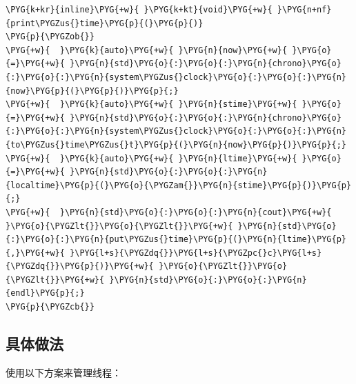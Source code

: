 \begin{codeblockbg}
\begin{Verbatim}[commandchars=\\\{\},breaklines=true,breakanywhere=true,fontsize=\codefont,xleftmargin=17bp]
\PYG{k+kr}{inline}\PYG{+w}{ }\PYG{k+kt}{void}\PYG{+w}{ }\PYG{n+nf}{print\PYGZus{}time}\PYG{p}{(}\PYG{p}{)}
\PYG{p}{\PYGZob{}}
\PYG{+w}{  }\PYG{k}{auto}\PYG{+w}{ }\PYG{n}{now}\PYG{+w}{ }\PYG{o}{=}\PYG{+w}{ }\PYG{n}{std}\PYG{o}{:}\PYG{o}{:}\PYG{n}{chrono}\PYG{o}{:}\PYG{o}{:}\PYG{n}{system\PYGZus{}clock}\PYG{o}{:}\PYG{o}{:}\PYG{n}{now}\PYG{p}{(}\PYG{p}{)}\PYG{p}{;}
\PYG{+w}{  }\PYG{k}{auto}\PYG{+w}{ }\PYG{n}{stime}\PYG{+w}{ }\PYG{o}{=}\PYG{+w}{ }\PYG{n}{std}\PYG{o}{:}\PYG{o}{:}\PYG{n}{chrono}\PYG{o}{:}\PYG{o}{:}\PYG{n}{system\PYGZus{}clock}\PYG{o}{:}\PYG{o}{:}\PYG{n}{to\PYGZus{}time\PYGZus{}t}\PYG{p}{(}\PYG{n}{now}\PYG{p}{)}\PYG{p}{;}
\PYG{+w}{  }\PYG{k}{auto}\PYG{+w}{ }\PYG{n}{ltime}\PYG{+w}{ }\PYG{o}{=}\PYG{+w}{ }\PYG{n}{std}\PYG{o}{:}\PYG{o}{:}\PYG{n}{localtime}\PYG{p}{(}\PYG{o}{\PYGZam{}}\PYG{n}{stime}\PYG{p}{)}\PYG{p}{;}
\PYG{+w}{  }\PYG{n}{std}\PYG{o}{:}\PYG{o}{:}\PYG{n}{cout}\PYG{+w}{ }\PYG{o}{\PYGZlt{}}\PYG{o}{\PYGZlt{}}\PYG{+w}{ }\PYG{n}{std}\PYG{o}{:}\PYG{o}{:}\PYG{n}{put\PYGZus{}time}\PYG{p}{(}\PYG{n}{ltime}\PYG{p}{,}\PYG{+w}{ }\PYG{l+s}{\PYGZdq{}}\PYG{l+s}{\PYGZpc{}c}\PYG{l+s}{\PYGZdq{}}\PYG{p}{)}\PYG{+w}{ }\PYG{o}{\PYGZlt{}}\PYG{o}{\PYGZlt{}}\PYG{+w}{ }\PYG{n}{std}\PYG{o}{:}\PYG{o}{:}\PYG{n}{endl}\PYG{p}{;}
\PYG{p}{\PYGZcb{}}
\end{Verbatim}
\end{codeblockbg}



\subsection{具体做法}



使用以下方案来管理线程：



